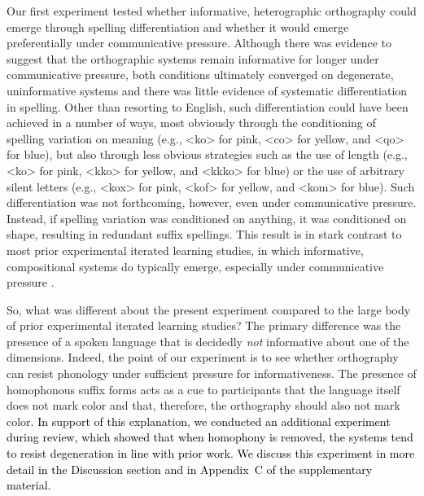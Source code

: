 \documentclass[doc,biblatex]{apa7}
\newcommand\firstrevision[1]{\textcolor{black}{#1}}
\begin{document}
Our first experiment tested whether informative, heterographic orthography could emerge through spelling differentiation and whether it would emerge preferentially under communicative pressure. Although there was evidence to suggest that the orthographic systems remain informative for longer under communicative pressure, both conditions ultimately converged on degenerate, uninformative systems and there was little evidence of systematic differentiation in spelling. Other than resorting to English, such differentiation could have been achieved in a number of ways, most obviously through the conditioning of spelling variation on meaning (e.g., <ko> for pink, <co> for yellow, and <qo> for blue), but also through less obvious strategies such as the use of length (e.g., <ko> for pink, <kko> for yellow, and <kkko> for blue) or the use of arbitrary silent letters (e.g., <kox> for pink, <kof> for yellow, and <kom> for blue). Such differentiation was not forthcoming, however, even under communicative pressure. Instead, if spelling variation was conditioned on anything, it was conditioned on shape, resulting in redundant suffix spellings. This result is in stark contrast to most prior experimental iterated learning studies, in which informative, compositional systems do typically emerge, especially under communicative pressure \parencite[e.g.,][]{Kirby:2015}.

So, what was different about the present experiment compared to the large body of prior experimental iterated learning studies? The primary difference was the presence of a spoken language that is decidedly \textit{not} informative about one of the dimensions. Indeed, the point of our experiment is to see whether orthography can resist phonology under sufficient pressure for informativeness. The presence of homophonous suffix forms acts as a cue to participants that the language itself does not mark color and that, therefore, the orthography should also not mark color. \firstrevision{In support of this explanation, we conducted an additional experiment during review, which showed that when homophony is removed, the systems tend to resist degeneration in line with prior work. We discuss this experiment in more detail in the Discussion section and in Appendix~C of the supplementary material.}
\end{document}
